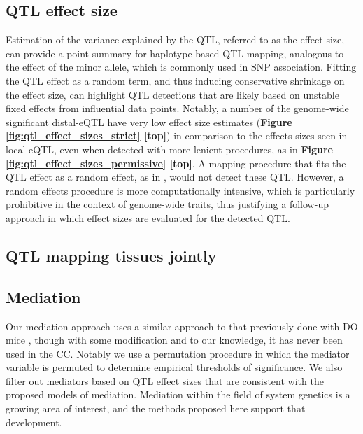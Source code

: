 
\subsection{QTL effect size}

Estimation of the variance explained by the QTL, referred to as the effect size, can provide a point summary for haplotype-based QTL mapping, analogous to the effect of the minor allele, which is commonly used in SNP association. Fitting the QTL effect as a random term, and thus inducing conservative shrinkage on the effect size, can highlight QTL detections that are likely based on unstable fixed effects from influential data points. Notably, a number of the genome-wide significant distal-eQTL have very low effect size estimates (\textbf{Figure \ref{fig:qtl_effect_sizes_strict} [top]}) in comparison to the effects sizes seen in local-eQTL, even when detected with more lenient procedures, as in \textbf{Figure \ref{fig:qtl_effect_sizes_permissive} [top]}. A mapping procedure that fits the QTL effect as a random effect, as in \cite{Wei2016}, would not detect these QTL. However, a random effects procedure is more computationally intensive, which is particularly prohibitive in the context of genome-wide traits, thus justifying a follow-up approach in which effect sizes are evaluated for the detected QTL.

\subsection{QTL mapping tissues jointly}

\subsection{Mediation}

Our mediation approach uses a similar approach to that previously done with DO mice \citep{Chick2016,Keller2018}, though with some modification and to our knowledge, it has never been used in the CC. Notably we use a permutation procedure in which the mediator variable is permuted to determine empirical thresholds of significance. We also filter out mediators based on QTL effect sizes that are consistent with the proposed models of mediation. Mediation within the field of system genetics is a growing area of interest, and the methods proposed here support that development.
